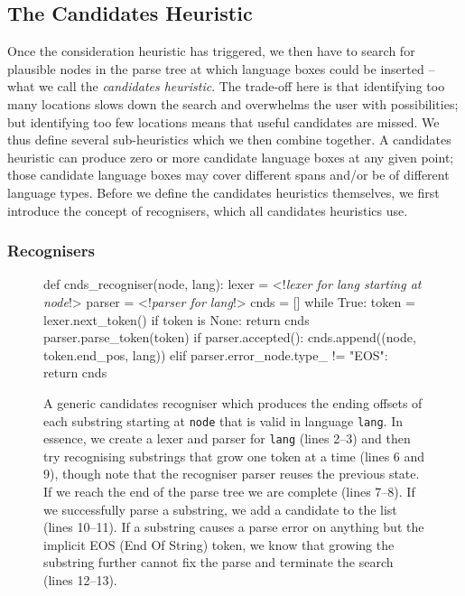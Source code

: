 \documentclass[sigplan,screen]{acmart}
\begin{document}
\subsection{The Candidates Heuristic}

Once the consideration heuristic has triggered, we then have to search for
plausible nodes in the parse tree at which
language boxes could be inserted -- what we call the
\emph{candidates heuristic}. The trade-off here is that identifying too many
locations slows down the search and overwhelms the user with possibilities; but
identifying too few locations means that useful candidates are missed. We thus
define several sub-heuristics which we then combine together. A candidates heuristic
can produce zero or more candidate language boxes at any given point; those
candidate language boxes may cover different spans and/or be of different
language types. Before we define the candidates heuristics themselves, we first
introduce the concept of recognisers, which all candidates heuristics use.


\subsubsection{Recognisers}
\label{sec:recognisers}

\begin{figure}
\begin{lstdefault}[]
def cnds_recogniser(node, lang):
  lexer = <!\textrm{\textit{lexer for lang starting at node}}!>
  parser = <!\textrm{\textit{parser for lang}}!>
  cnds = []
  while True:
    token = lexer.next_token()
    if token is None:
      return cnds
    parser.parse_token(token)
    if parser.accepted():
      cnds.append((node, token.end_pos, lang))
    elif parser.error_node.type_ != "EOS":
        return cnds
\end{lstdefault}
\caption{A generic candidates recogniser which produces the ending offsets of
  each substring starting at \texttt{node} that is valid in language
  \texttt{lang}. In essence, we create a lexer and parser for \texttt{lang}
  (lines 2--3) and then try recognising substrings that grow one token at a
  time (lines 6 and 9), though note that the recogniser parser reuses the previous
  state. If we reach the end of the parse tree we are complete
  (lines 7--8). If we successfully parse a substring, we add a candidate to the
  list (lines 10--11). If a substring causes a parse error on anything but the
  implicit EOS (End Of String) token, we know that growing the substring
  further cannot fix the parse
    and terminate the search (lines 12--13).}
\label{fig:recogniser}
\end{figure}
\end{document}

